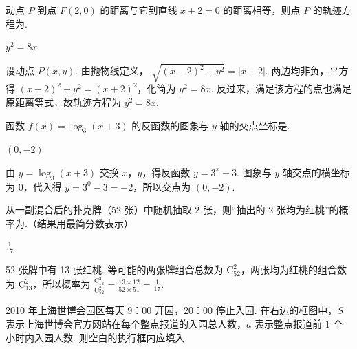 \begin{problem}
动点 \(P\) 到点 \(F(2,0)\) 的距离与它到直线 \(x + 2 = 0\) 的距离相等，则点 \(P\) 的轨迹方程为\fillinblank{}.
\end{problem}

\begin{answer}
\(y^{2}=8x\)
\end{answer}

\begin{solution}
设动点 \(P(x,y)\). 由抛物线定义，
\(\sqrt{(x-2)^2+y^2}=|x+2|\).
两边均非负，平方得 \((x-2)^2+y^2=(x+2)^2\)，化简为 \(y^2=8x\). 反过来，满足该方程的点也满足原距离等式，故轨迹方程为 \(y^2=8x\).
\end{solution}

\begin{problem}
函数 \( f(x) = \log_3(x + 3) \) 的反函数的图象与 \( y \) 轴的交点坐标是\fillinblank{}.
\end{problem}

\begin{answer}
\((0,-2)\)
\end{answer}

\begin{solution}
由 \(y=\log_3(x+3)\) 交换 \(x\)，\(y\)，得反函数 \(y=3^x-3\). 图象与 \(y\) 轴交点的横坐标为 \(0\)，代入得 \(y=3^0-3=-2\)，所以交点为 \((0,-2)\).
\end{solution}

\begin{problem}
从一副混合后的扑克牌（52 张）中随机抽取 2 张，则“抽出的 2 张均为红桃”的概率为\fillinblank{}.（结果用最简分数表示）
\end{problem}

\begin{answer}
\(\frac{1}{17}\)
\end{answer}

\begin{solution}
52 张牌中有 13 张红桃. 等可能的两张牌组合总数为 \(\mathrm C_{52}^{2}\)，两张均为红桃的组合数为 \(\mathrm C_{13}^{2}\)，所以概率为
\(\frac{\mathrm C_{13}^{2}}{\mathrm C_{52}^{2}}=\frac{13\times12}{52\times51}=\frac{1}{17}\).
\end{solution}

\begin{problem}
2010 年上海世博会园区每天 9：00 开园，20：00 停止入园. 在右边的框图中，\(S\) 表示上海世博会官方网站在每个整点报道的入园总人数，\(a\) 表示整点报道前 1 个小时内入园人数. 则空白的执行框内应填入\fillinblank{}.

\end{problem}

